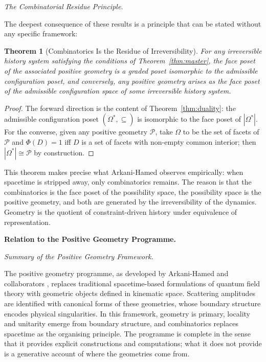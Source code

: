 \documentclass[11pt]{article}
\theoremstyle{plain}
\newtheorem{theorem}{Theorem}[section]
\theoremstyle{definition}
\theoremstyle{remark}
\newcommand{\Phif}{\Phi}
\newcommand{\OmKS}{\Omega}
\begin{document}
\medskip\noindent\textit{The Combinatorial Residue Principle.}

The deepest consequence of these results is a principle that can be stated without any specific framework:

\begin{theorem}[Combinatorics Is the Residue of Irreversibility]
For any irreversible history system satisfying the conditions of Theorem~\ref{thm:master}, the face poset of the associated positive geometry is a graded poset isomorphic to the admissible configuration poset, and conversely, any positive geometry arises as the face poset of the admissible configuration space of some irreversible history system.
\end{theorem}

\begin{proof}
The forward direction is the content of Theorem~\ref{thm:duality}: the admissible configuration poset $(\OmKS^*, \subseteq)$ is isomorphic to the face poset of $|\OmKS^*|$. For the converse, given any positive geometry $\mathcal{P}$, take $\OmKS$ to be the set of facets of $\mathcal{P}$ and $\Phif(D) = 1$ iff $D$ is a set of facets with non-empty common interior; then $|\OmKS^*| \cong \mathcal{P}$ by construction.
\end{proof}

This theorem makes precise what Arkani-Hamed observes empirically: when spacetime is stripped away, only combinatorics remains. The reason is that the combinatorics is the face poset of the possibility space, the possibility space is the positive geometry, and both are generated by the irreversibility of the dynamics. Geometry is the quotient of constraint-driven history under equivalence of representation.

\bigskip\noindent\textbf{Relation to the Positive Geometry Programme.}
\label{sec:relation}

\medskip\noindent\textit{Summary of the Positive Geometry Framework.}

The positive geometry programme, as developed by Arkani-Hamed and collaborators \cite{ArkaniHamed2017, ArkaniHamed2014, ArkaniHamed2012}, replaces traditional spacetime-based formulations of quantum field theory with geometric objects defined in kinematic space. Scattering amplitudes are identified with canonical forms of these geometries, whose boundary structure encodes physical singularities. In this framework, geometry is primary, locality and unitarity emerge from boundary structure, and combinatorics replaces spacetime as the organising principle. The programme is complete in the sense that it provides explicit constructions and computations; what it does not provide is a generative account of where the geometries come from.
\end{document}
